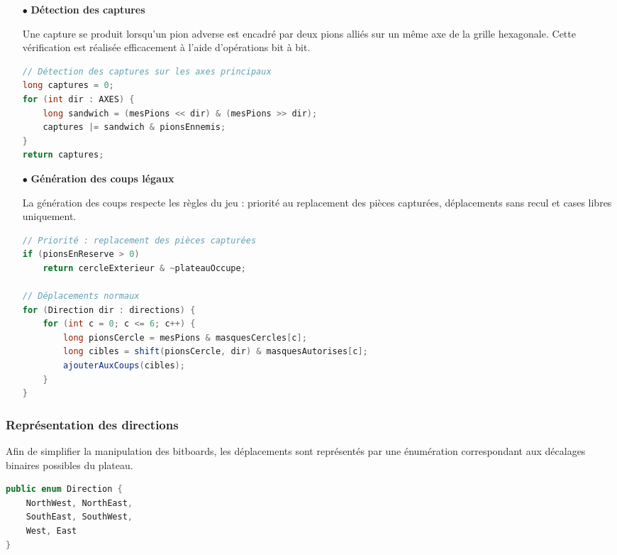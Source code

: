 \documentclass[9pt]{extarticle} %
\begin{document}
\begin{itemize}
    \item[$\bullet$] \textbf{Détection des captures}

    Une capture se produit lorsqu’un pion adverse est encadré par deux pions alliés sur un même axe de la grille hexagonale.  
    Cette vérification est réalisée efficacement à l’aide d’opérations bit à bit.

\begin{lstlisting}[language=Java, caption=Détection des captures par bitboards]
// Détection des captures sur les axes principaux
long captures = 0;
for (int dir : AXES) {
    long sandwich = (mesPions << dir) & (mesPions >> dir);
    captures |= sandwich & pionsEnnemis;
}
return captures;
\end{lstlisting}

    \item[$\bullet$] \textbf{Génération des coups légaux}

    La génération des coups respecte les règles du jeu : priorité au replacement des pièces capturées, déplacements sans recul et cases libres uniquement.

\begin{lstlisting}[language=Java, caption=Génération des coups légaux]
// Priorité : replacement des pièces capturées
if (pionsEnReserve > 0)
    return cercleExterieur & ~plateauOccupe;

// Déplacements normaux
for (Direction dir : directions) {
    for (int c = 0; c <= 6; c++) {
        long pionsCercle = mesPions & masquesCercles[c];
        long cibles = shift(pionsCercle, dir) & masquesAutorises[c];
        ajouterAuxCoups(cibles);
    }
}
\end{lstlisting}
\end{itemize}

\subsubsection{Représentation des directions}

Afin de simplifier la manipulation des bitboards, les déplacements sont représentés par une énumération correspondant aux décalages binaires possibles du plateau.

\begin{lstlisting}[language=Java, caption=Enumération des directions]
public enum Direction {
    NorthWest, NorthEast,
    SouthEast, SouthWest,
    West, East
}
\end{lstlisting}
\end{document}
